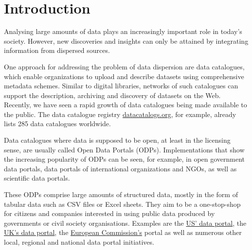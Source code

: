 \documentclass[conference]{IEEEtran}
\begin{document}


\section{Introduction}
\label{sec:introduction} 

Analysing large amounts of data plays an increasingly important role in today's society. 
However, new discoveries and insights can only be attained by integrating information from dispersed sources. 

One approach for addressing the problem of data dispersion are data catalogues, which enable organizations to upload and describe datasets using comprehensive metadata schemes. 
Similar to digital libraries, networks of such catalogues can support the description, archiving and discovery of datasets on the Web. 
Recently, we have seen a rapid growth of data catalogues being made available to the public. 
The data catalogue registry \href{http://datacatalogs.org}{datacatalogs.org}, for example, already lists 285 data catalogues worldwide. 

Data catalogues where data is supposed to be open, at least in the licensing sense, are usually called Open Data Portals (ODPs).
Implementations that show the increasing popularity of ODPs can be seen, for example, in open government data portals, data portals of international organizations and NGOs, as well as scientific data portals.

These ODPs comprise large amounts of structured data, mostly in the form of tabular data such as CSV files or Excel sheets. 
They aim to be a one-stop-shop for citizens and companies interested in using public data produced by governments or civil society organisations.
Examples are the \href{http://data.gov}{US' data portal}, the \href{http://data.gov.uk}{UK's data portal}, the \href{http://open-data.europa.eu}{European Commission's} portal as well as numerous other local, regional and national data portal initiatives.
\end{document}
